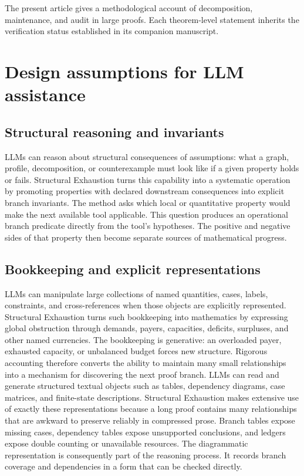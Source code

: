 \documentclass[11pt]{article}
\begin{document}
The present article gives a methodological account of decomposition,
maintenance, and audit in large proofs. Each theorem-level statement inherits
the verification status established in its companion manuscript.
\section{Design assumptions for LLM assistance}
\subsection{Structural reasoning and invariants}
LLMs can reason about structural consequences of assumptions: what a graph, profile, decomposition, or counterexample must look like if a given property holds or fails.
Structural Exhaustion turns this capability into a systematic operation by promoting properties with declared downstream consequences into explicit branch invariants.
The method asks which local or quantitative property would make the next available tool applicable. This question produces an operational branch predicate directly from the tool's hypotheses.
The positive and negative sides of that property then become separate sources of mathematical progress.
\subsection{Bookkeeping and explicit representations}
LLMs can manipulate large collections of named quantities, cases, labels, constraints, and cross-references when those objects are explicitly represented.
Structural Exhaustion turns such bookkeeping into mathematics by expressing global obstruction through demands, payers, capacities, deficits, surpluses, and other named currencies.
The bookkeeping is generative: an overloaded payer, exhausted capacity, or unbalanced budget forces new structure.
Rigorous accounting therefore converts the ability to maintain many small relationships into a mechanism for discovering the next proof branch.
LLMs can read and generate structured textual objects such as tables, dependency diagrams, case matrices, and finite-state descriptions.
Structural Exhaustion makes extensive use of exactly these representations because a long proof contains many relationships that are awkward to preserve reliably in compressed prose.
Branch tables expose missing cases, dependency tables expose unsupported conclusions, and ledgers expose double counting or unavailable resources.
The diagrammatic representation is consequently part of the reasoning process. It records branch coverage and dependencies in a form that can be checked directly.
\end{document}
